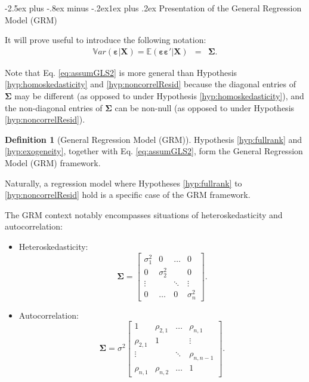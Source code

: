 \documentclass[
  11pt,
]{book}
\makeatletter
\renewcommand\subsection{\@startsection{subsection}{2}{\z@}
  {-2.5ex plus -.8ex minus -.2ex}{1ex plus .2ex}
  {\normalfont\large\bfseries\color{TextbookInk}}}
\theoremstyle{definition}
\newtheorem{definition}{Definition}[chapter]
\theoremstyle{definition}
\theoremstyle{definition}
\theoremstyle{definition}
\theoremstyle{remark}
\makeatother
\begin{document}
\subsection{Presentation of the General Regression Model (GRM)}\label{presentation-of-the-general-regression-model-grm}

It will prove useful to introduce the following notation:
\begin{eqnarray}
\mathbb{V}ar(\boldsymbol\varepsilon | \mathbf{X}) = \mathbb{E}(\boldsymbol\varepsilon \boldsymbol\varepsilon'| \mathbf{X}) &=& \boldsymbol\Sigma. \label{eq:assumGLS2}
\end{eqnarray}

Note that Eq. \eqref{eq:assumGLS2} is more general than Hypothesis \ref{hyp:homoskedasticity} and \ref{hyp:noncorrelResid} because the diagonal entries of \(\boldsymbol\Sigma\) may be different (as opposed to under Hypothesis \ref{hyp:homoskedasticity}), and the non-diagonal entries of \(\boldsymbol\Sigma\) can be non-null (as opposed to under Hypothesis \ref{hyp:noncorrelResid}).

\begin{definition}[General Regression Model (GRM)]
\protect\hypertarget{def:GRM}{}\label{def:GRM}Hypothesis \ref{hyp:fullrank} and \ref{hyp:exogeneity}, together with Eq. \eqref{eq:assumGLS2}, form the General Regression Model (GRM) framework.
\end{definition}

Naturally, a regression model where Hypotheses \ref{hyp:fullrank} to \ref{hyp:noncorrelResid} hold is a specific case of the GRM framework.

The GRM context notably encompasses situations of heteroskedasticity and autocorrelation:

\begin{itemize}
\item
  Heteroskedasticity:
  \begin{equation}
  \boldsymbol\Sigma = \left[  \begin{array}{cccc}
  \sigma_1^2 & 0 & \dots & 0 \\
  0 & \sigma_2^2 &  & 0 \\
  \vdots && \ddots& \vdots \\
  0 & \dots & 0 & \sigma_n^2
  \end{array} \right]. \label{eq:heteroskedasticity}
  \end{equation}
\item
  Autocorrelation:
  \begin{equation}
  \boldsymbol\Sigma = \sigma^2 \left[ \begin{array}{cccc}
  1 & \rho_{2,1} & \dots & \rho_{n,1} \\
  \rho_{2,1} & 1 &  & \vdots \\
  \vdots && \ddots& \rho_{n,n-1} \\
  \rho_{n,1} & \rho_{n,2} & \dots & 1
  \end{array} \right]. \label{eq:autocorrelation}
  \end{equation}
\end{itemize}
\end{document}
